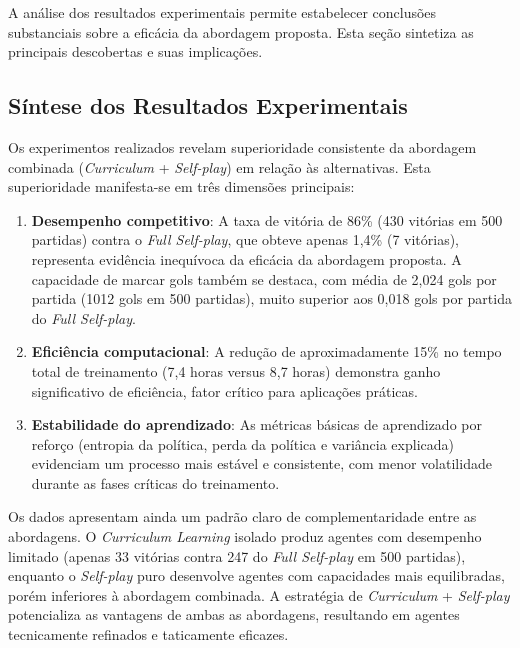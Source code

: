 A análise dos resultados experimentais permite estabelecer conclusões substanciais sobre a eficácia da abordagem proposta. Esta seção sintetiza as principais descobertas e suas implicações.

\subsection{Síntese dos Resultados Experimentais}

Os experimentos realizados revelam superioridade consistente da abordagem combinada (\textit{Curriculum} + \textit{Self-play}) em relação às alternativas. Esta superioridade manifesta-se em três dimensões principais:

\begin{enumerate}
    \item \textbf{Desempenho competitivo}: A taxa de vitória de 86\% (430 vitórias em 500 partidas) contra o \textit{Full Self-play}, que obteve apenas 1,4\% (7 vitórias), representa evidência inequívoca da eficácia da abordagem proposta. A capacidade de marcar gols também se destaca, com média de 2,024 gols por partida (1012 gols em 500 partidas), muito superior aos 0,018 gols por partida do \textit{Full Self-play}.

    \item \textbf{Eficiência computacional}: A redução de aproximadamente 15\% no tempo total de treinamento (7,4 horas versus 8,7 horas) demonstra ganho significativo de eficiência, fator crítico para aplicações práticas.

    \item \textbf{Estabilidade do aprendizado}: As métricas básicas de aprendizado por reforço (entropia da política, perda da política e variância explicada) evidenciam um processo mais estável e consistente, com menor volatilidade durante as fases críticas do treinamento.
\end{enumerate}

Os dados apresentam ainda um padrão claro de complementaridade entre as abordagens. O \textit{Curriculum Learning} isolado produz agentes com desempenho limitado (apenas 33 vitórias contra 247 do \textit{Full Self-play} em 500 partidas), enquanto o \textit{Self-play} puro desenvolve agentes com capacidades mais equilibradas, porém inferiores à abordagem combinada. A estratégia de \textit{Curriculum} + \textit{Self-play} potencializa as vantagens de ambas as abordagens, resultando em agentes tecnicamente refinados e taticamente eficazes.

